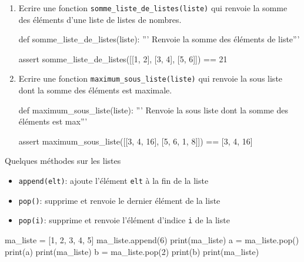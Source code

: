 \begin{exercice_cours}{}
	\begin{enumerate}
		\item Ecrire une fonction \texttt{somme\_liste\_de\_listes(liste)} qui renvoie la somme des éléments d'une liste de listes de nombres.
		
		\begin{CodePythontexAlt}[TaillePolice=\normalsize, Largeur=1\linewidth,Centre,PremLigne=1, Lignes=false,]{}
				def somme_liste_de_listes(liste):
					''' Renvoie la somme des éléments de liste'''







				
				assert somme_liste_de_listes([[1, 2], [3, 4], [5, 6]]) == 21
				\end{CodePythontexAlt}

		\item Ecrire une fonction \texttt{maximum\_sous\_liste(liste)} qui renvoie la sous liste dont la somme des éléments est maximale.
		\begin{CodePythontexAlt}[TaillePolice=\normalsize, Largeur=1\linewidth,Centre,PremLigne=1, Lignes=false,]{}
				def maximum_sous_liste(liste):
					''' Renvoie la sous liste dont la somme des éléments est max'''









				assert maximum_sous_liste([[3, 4, 16], [5, 6, 1, 8]]) == [3, 4, 16]
				\end{CodePythontexAlt}
	\end{enumerate}
\end{exercice_cours}

\begin{easybox}{Quelques méthodes sur les listes}{}

\begin{itemize}
\item \verb|append(elt)|: ajoute l'élément \verb|elt| à la fin de la liste	
\item \verb|pop()|: supprime et renvoie le dernier élément de la liste
\item \verb|pop(i)|: supprime et renvoie l'élément d'indice \verb|i| de la liste
\end{itemize}

\begin{ConsolePythontex}[TaillePolice=\normalsize, Label=false]{}
ma_liste = [1, 2, 3, 4, 5]
ma_liste.append(6)
print(ma_liste)
a = ma_liste.pop()
print(a)
print(ma_liste)
b = ma_liste.pop(2)
print(b)
print(ma_liste)
		\end{ConsolePythontex}
\end{easybox}

